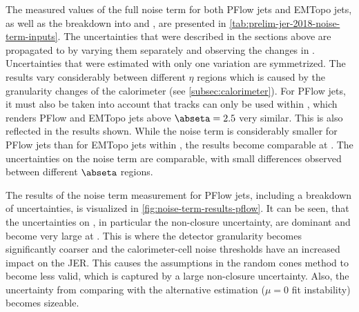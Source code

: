 The measured values of the full noise term for both PFlow jets and EMTopo jets, as well as the breakdown into \Npileup and \Nmuzero, are presented in \cref{tab:prelim-jer-2018-noise-term-inputs}.
The uncertainties that were described in the sections above are propagated to \Nfull by varying them separately and observing the changes in \Nfull. Uncertainties that were estimated with only one variation are symmetrized.
The results vary considerably between different $\eta$ regions which is caused by the granularity changes of the calorimeter (see \cref{subsec:calorimeter}). For PFlow jets, it must also be taken into account that tracks can only be used within , which renders PFlow and EMTopo jets above $\abseta = 2.5$ very similar. This is also reflected in the results shown. While the noise term is considerably smaller for PFlow jets than for EMTopo jets within , the results become comparable at . The uncertainties on the noise term are comparable, with small differences observed between different $\abseta$ regions.

The results of the noise term measurement for PFlow jets, including a breakdown of uncertainties, is visualized in \cref{fig:noise-term-results-pflow}.
%
It can be seen, that the uncertainties on \Npileup, in particular the non-closure uncertainty, are dominant and become very large at . This is where the detector granularity becomes significantly coarser and the calorimeter-cell noise thresholds have an increased impact on the JER. This causes the assumptions in the random cones method to become less valid, which is captured by a large non-closure uncertainty.
Also, the uncertainty from comparing \Nmuzero with the alternative estimation ($\mu=0$ fit instability) becomes sizeable.




